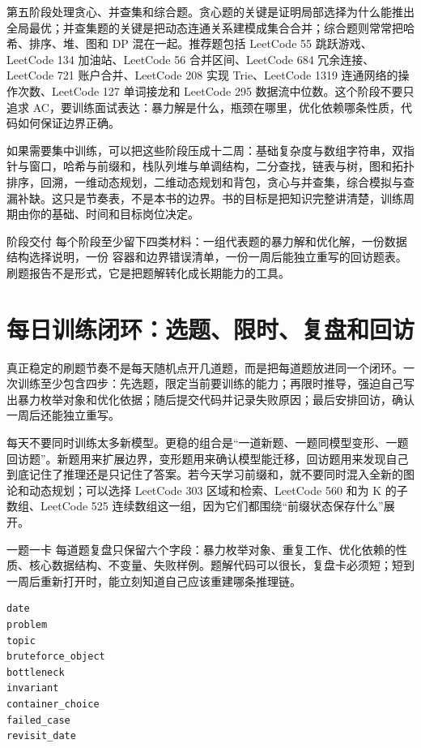 第五阶段处理贪心、并查集和综合题。贪心题的关键是证明局部选择为什么能推出全局最优；并查集题的关键是把动态连通关系建模成集合合并；综合题则常常把哈希、排序、堆、图和 DP 混在一起。推荐题包括 LeetCode 55 跳跃游戏、LeetCode 134 加油站、LeetCode 56 合并区间、LeetCode 684 冗余连接、LeetCode 721 账户合并、LeetCode 208 实现 Trie、LeetCode 1319 连通网络的操作次数、LeetCode 127 单词接龙和 LeetCode 295 数据流中位数。这个阶段不要只追求 AC，要训练面试表达：暴力解是什么，瓶颈在哪里，优化依赖哪条性质，代码如何保证边界正确。

如果需要集中训练，可以把这些阶段压成十二周：基础复杂度与数组字符串，双指针与窗口，哈希与前缀和，栈队列堆与单调结构，二分查找，链表与树，图和拓扑排序，回溯，一维动态规划，二维动态规划和背包，贪心与并查集，综合模拟与查漏补缺。这只是节奏表，不是本书的边界。书的目标是把知识完整讲清楚，训练周期由你的基础、时间和目标岗位决定。

\begin{principlebox}{阶段交付}
每个阶段至少留下四类材料：一组代表题的暴力解和优化解，一份数据结构选择说明，一份 \cpp 容器和边界错误清单，一份一周后能独立重写的回访题表。刷题报告不是形式，它是把题解转化成长期能力的工具。
\end{principlebox}

\section{每日训练闭环：选题、限时、复盘和回访}

真正稳定的刷题节奏不是每天随机点开几道题，而是把每道题放进同一个闭环。一次训练至少包含四步：先选题，限定当前要训练的能力；再限时推导，强迫自己写出暴力枚举对象和优化依据；随后提交代码并记录失败原因；最后安排回访，确认一周后还能独立重写。

每天不要同时训练太多新模型。更稳的组合是“一道新题、一题同模型变形、一题回访题”。新题用来扩展边界，变形题用来确认模型能迁移，回访题用来发现自己到底记住了推理还是只记住了答案。若今天学习前缀和，就不要同时混入全新的图论和动态规划；可以选择 LeetCode 303 区域和检索、LeetCode 560 和为 K 的子数组、LeetCode 525 连续数组这一组，因为它们都围绕“前缀状态保存什么”展开。

\begin{principlebox}{一题一卡}
每道题复盘只保留六个字段：暴力枚举对象、重复工作、优化依赖的性质、核心数据结构、不变量、失败样例。题解代码可以很长，复盘卡必须短；短到一周后重新打开时，能立刻知道自己应该重建哪条推理链。
\end{principlebox}

\begin{lstlisting}[numbers=none,caption={每日刷题记录的最小字段}]
date
problem
topic
bruteforce_object
bottleneck
invariant
container_choice
failed_case
revisit_date
\end{lstlisting}

